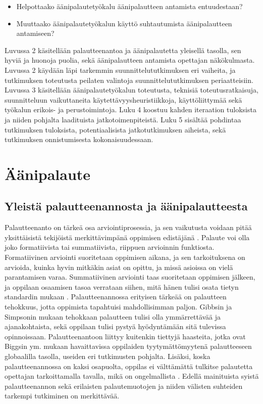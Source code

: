 \documentclass[utf8]{gradu3}
\begin{document}
\begin{itemize}
  \item Helpottaako äänipalautetyökalu äänipalautteen antamista entuudestaan?
  \item Muuttaako äänipalautetyökalun käyttö suhtautumista äänipalautteen antamiseen?
\end{itemize}

Luvussa 2 käsitellään palautteenantoa ja äänipalautetta yleisellä tasolla, sen hyviä ja huonoja puolia, sekä äänipalautteen antamista opettajan näkökulmasta. Luvussa 2 käydään läpi tarkemmin suunnittelututkimuksen eri vaiheita, ja tutkimuksen toteutusta peilaten valintoja suunnittelututkimuksen periaatteisiin. Luvussa 3 käsitellään äänipalautetyökalun toteutusta, teknisiä toteutusratkaisuja, suunnitteluun vaikuttaneita käytettävyysheuristiikkoja, käyttöliittymää sekä työkalun erikois- ja perustoimintoja. Luku 4 koostuu kahden iteraation tuloksista ja niiden pohjalta laadituista jatkotoimenpiteistä. Luku 5 sisältää pohdintaa tutkimuksen tuloksista, potentiaalisista jatkotutkimuksen aiheista, sekä tutkimuksen onnistumisesta kokonaisuudessaan. 

\chapter{Äänipalaute}

\section{Yleistä palautteenannosta ja äänipalautteesta}

Palautteenanto on tärkeä osa arviointiprosessia, ja sen vaikutusta voidaan pitää yksittäisistä tekijöistä merkittävimpänä oppimisen edistäjänä \parencite{gibbs2004}. Palaute voi olla joko formatiivista tai summatiivista, riippuen arvioinnin funktiosta. Formatiivinen arviointi suoritetaan oppimisen aikana, ja sen tarkoituksena on arvioida, kuinka hyvin mitkäkin asiat on opittu, ja missä asioissa on vielä parantamisen varaa. Summatiivinen arviointi taas suoritetaan oppimisen jälkeen, ja oppilaan osaamisen tasoa verrataan siihen, mitä hänen tulisi osata tietyn standardin mukaan \parencite{biggs2011}. Palautteenannossa erityisen tärkeää on palautteen tehokkuus, jotta oppimista tapahtuisi mahdollisimman paljon. Gibbsin ja Simpsonin \parencite*{gibbs2004} mukaan tehokkaan palautteen tulisi olla ymmärrettävää ja ajanakohtaista, sekä oppilaan tulisi pystyä hyödyntämään sitä tulevissa opinnoissaan. Palautteenantoon liittyy kuitenkin tiettyjä haasteita, jotka ovat Biggsin ym. \parencite*{biggs2011} mukaan havaittavissa oppilaiden tyytymättömyytenä palautteeseen globaalilla tasolla, useiden eri tutkimusten pohjalta. Lisäksi, koska palautteenannossa on kaksi osapuolta, oppilas ei välttämättä tulkitse palautetta opettajan tarkoittamalla tavalla, mikä on ongelmallista \parencite{sadler2010}. Edellä mainituista syistä palautteenannon sekä erilaisten palautemuotojen ja niiden välisten suhteiden tarkempi tutkiminen on merkittävää. 
\end{document}
